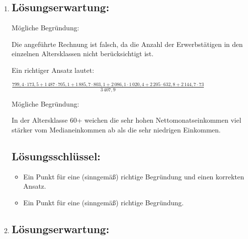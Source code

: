 \begin{langesbeispiel}
{\begin{enumerate}
Die Gegenüberstellung der Nettomonatseinkommen in Boxplots (Kastenschaubildern) ist anhand der gegebenen Daten nicht möglich, da die niedrigsten und die höchsten Nettomonatseinkommen (Minimum und Maximum) in der Tabelle nicht angegeben sind.

	\subsection{Lösungsschlüssel:}
	\begin{itemize}
		\item Ein Punkt für ein korrektes Diagramm.
		\item Ein Punkt für eine (sinngemäß) richtige Begründung. 
	\end{itemize}
	
	\item \subsection{Lösungserwartung:}
			
Mögliche Begründung:

Die angeführte Rechnung ist falsch, da die Anzahl der Erwerbstätigen in den einzelnen Altersklassen nicht berücksichtigt ist.

Ein richtiger Ansatz lautet:

$\frac{799,4\cdot 173,5+1\,487\cdot 705,1+1\,885,7\cdot 803,1+2\,086,1\cdot 1\,020,4+2\,205\cdot 632,8+2\,144,7\cdot 73}{3\,407,9}$\leer

Mögliche Begründung:

In der Altersklasse 60+ weichen die sehr hohen  Nettomonatseinkommen viel stärker vom Medianeinkommen ab als die sehr niedrigen Einkommen.
	
	\subsection{Lösungsschlüssel:}
	
\begin{itemize}
	\item Ein Punkt für eine (sinngemäß) richtige Begründung und einen korrekten Ansatz.
	\item Ein Punkt für eine (sinngemäß) richtige Begründung. 
\end{itemize}

\item \subsection{Lösungserwartung:}
			

\end{enumerate}}
\end{langesbeispiel}
